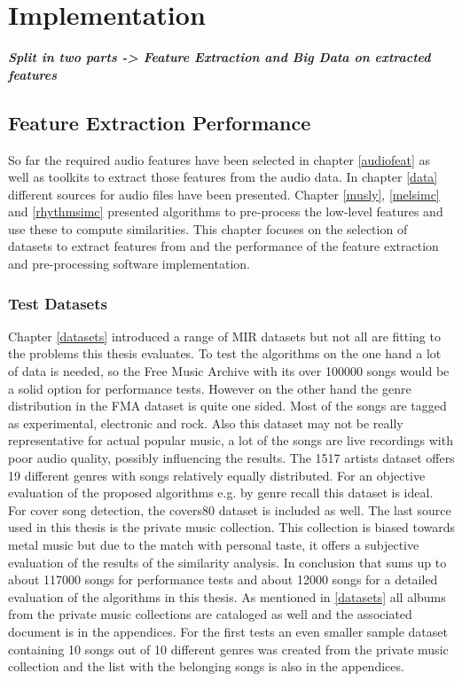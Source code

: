 
\chapter{Implementation}

\textit{\textbf{Split in two parts -> Feature Extraction and Big Data on extracted features}}

\section{Feature Extraction Performance}\label{simmet}

So far the required audio features have been selected in chapter \ref{audiofeat} as well as toolkits to extract those features from the audio data.
In chapter \ref{data} different sources for audio files have been presented. Chapter \ref{musly}, \ref{melsimc} and \ref{rhythmsimc} presented algorithms to pre-process the low-level features and use these to compute similarities. 
This chapter focuses on the selection of datasets to extract features from and the performance of the feature extraction and pre-processing software implementation.  

\subsection{Test Datasets}

Chapter \ref{datasets} introduced a range of MIR datasets but not all are fitting to the problems this thesis evaluates. To test the algorithms on the one hand a lot of data is needed, so the Free Music Archive with its over 100000 songs would be a solid option for performance tests. However on the other hand the genre distribution in the FMA dataset is quite one sided. Most of the songs are tagged as experimental, electronic and rock. Also this dataset may not be really representative for actual popular music, a lot of the songs are live recordings with poor audio quality, possibly influencing the results.
The 1517 artists dataset offers 19 different genres with songs relatively equally distributed. For an objective evaluation of the proposed algorithms e.g. by genre recall this dataset is ideal. For cover song detection, the covers80 dataset is included as well.
The last source used in this thesis is the private music collection. This collection is biased towards metal music but due to the match with personal taste, it offers a subjective evaluation of the results of the similarity analysis. 
In conclusion that sums up to about 117000 songs for performance tests and about 12000 songs for a detailed evaluation of the algorithms in this thesis. As mentioned in \ref{datasets} all albums from the private music collections are cataloged as well and the associated document is in the appendices. For the first tests an even smaller sample dataset containing 10 songs out of 10 different genres was created from the private music collection and the list with the belonging songs is also in the appendices.

